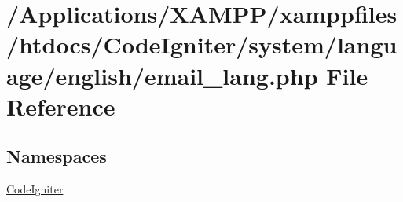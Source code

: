 \hypertarget{email__lang_8php}{}\section{/\+Applications/\+X\+A\+M\+P\+P/xamppfiles/htdocs/\+Code\+Igniter/system/language/english/email\+\_\+lang.php File Reference}
\label{email__lang_8php}
\subsection*{Namespaces}
\begin{DoxyCompactItemize}
\item 
 \mbox{\hyperlink{namespace_code_igniter}{Code\+Igniter}}
\end{DoxyCompactItemize}
